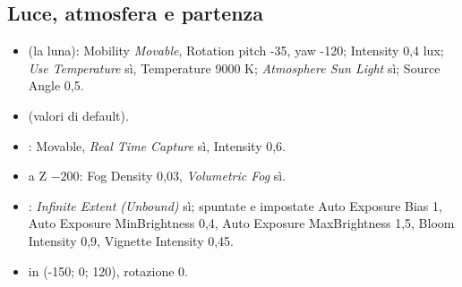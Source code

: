 \subsection{Luce, atmosfera e partenza}
\begin{itemize}
\item {} (la luna): Mobility \emph{Movable}, Rotation pitch -35, yaw -120; Intensity 0,4 lux; \emph{Use Temperature} sì, Temperature 9000 K; \emph{Atmosphere Sun Light} sì; Source Angle 0,5.
\item {} (valori di default).
\item {}: Movable, \emph{Real Time Capture} sì, Intensity 0,6.
\item {} a Z $-200$: Fog Density 0,03, \emph{Volumetric Fog} sì.
\item {}: \emph{Infinite Extent (Unbound)} sì; spuntate e impostate Auto Exposure Bias 1, Auto Exposure MinBrightness 0,4, Auto Exposure MaxBrightness 1,5, Bloom Intensity 0,9, Vignette Intensity 0,45.
\item {} in (-150; 0; 120), rotazione 0.
\end{itemize}

